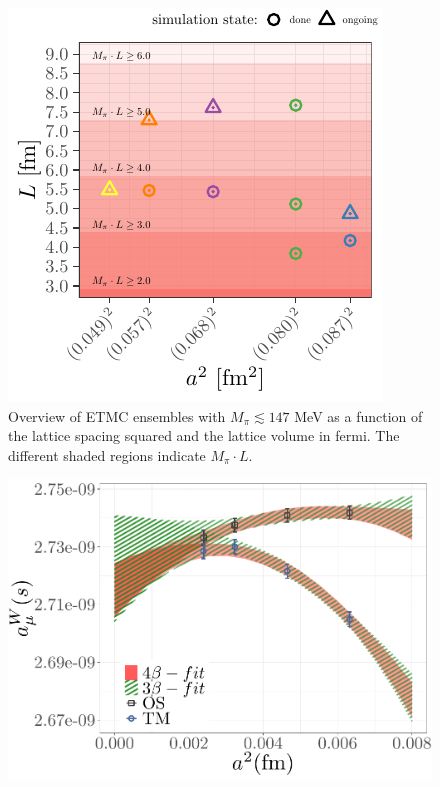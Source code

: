 \documentclass[a4paper,11pt]{article}
\begin{document}
\begin{figure}
  \includegraphics[width=0.5\linewidth]{plots/ensembles_phys_point}
  \caption{Overview of ETMC ensembles with $M_\pi \lesssim 147$ MeV as a function of the lattice spacing squared and the lattice volume in fermi. The different shaded regions indicate $M_\pi \cdot L$.}
  \label{fig:ensembles_phys_point}
\end{figure}

\begin{figure}
  \includegraphics[width=\linewidth]{plots/amu_s_W_a4}
\end{figure}
\end{document}

